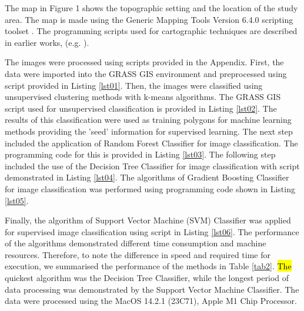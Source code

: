 \documentclass[12pt,a4paper,oneside]{article}
\def \newpar{\vspace{6pt}}
\begin{document}
\newpar The map in Figure 1 shows the topographic setting and the location of the study area. The map is made using the Generic Mapping Tools Version 6.4.0 scripting toolset \citep{Wessel}. The programming scripts used for cartographic techniques are described in earlier works, (e.g. \citep{Lemenkova202203,Lemenkova202216,Lemenkova202212}).

\newpar The images were processed using scripts provided in the Appendix. First, the data were imported into the GRASS GIS environment and preprocessed using script provided in Listing \ref{lst01}. Then, the images were classified using unsupervised clustering methods with k-means algorithms. The GRASS GIS script used for   unsupervised classification is provided in Listing \ref{lst02}. The results of this classification were used as training polygons for machine learning methods providing the 'seed' information for supervised learning. The next step included the application of Random Forest Classifier for image classification. The programming code for this is provided in Listing \ref{lst03}. The following step included the use of the Decision Tree Classifier for image classification with script demonstrated in Listing \ref{lst04}. The algorithms of Gradient Boosting Classifier for image classification was performed using programming code shown in Listing \ref{lst05}. 

\newpar Finally, the algorithm of Support Vector Machine (SVM) Classifier was applied for supervised image classification using script in Listing \ref{lst06}. The performance of the algorithms demonstrated different time consumption and machine resources. Therefore, to note the difference in speed and required time for execution, we summarised the performance of the methods in Table \ref{tab2}. \hl{The} quickest algorithm was the Decision Tree Classifier, while the longest period of data processing was demonstrated by the Support Vector Machine Classifier. The data were processed using the MacOS 14.2.1 (23C71), Apple M1 Chip Processor. 
\end{document}
